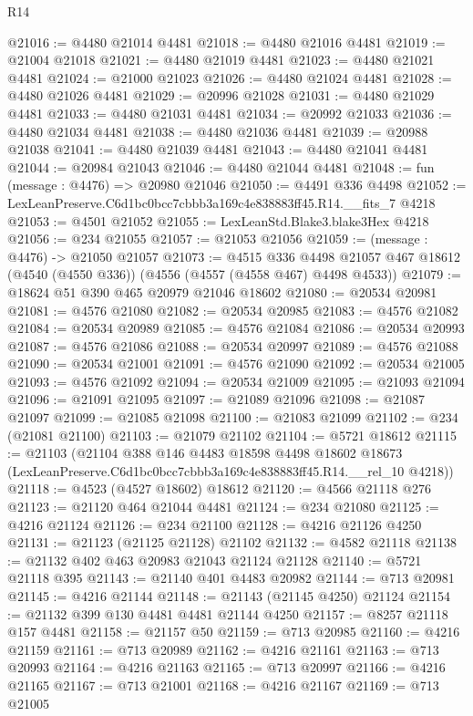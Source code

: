 \begin{lexlean}{R14}
\begin{coremodule}
@21016 := @4480 @21014 @4481
@21018 := @4480 @21016 @4481
@21019 := @21004 @21018
@21021 := @4480 @21019 @4481
@21023 := @4480 @21021 @4481
@21024 := @21000 @21023
@21026 := @4480 @21024 @4481
@21028 := @4480 @21026 @4481
@21029 := @20996 @21028
@21031 := @4480 @21029 @4481
@21033 := @4480 @21031 @4481
@21034 := @20992 @21033
@21036 := @4480 @21034 @4481
@21038 := @4480 @21036 @4481
@21039 := @20988 @21038
@21041 := @4480 @21039 @4481
@21043 := @4480 @21041 @4481
@21044 := @20984 @21043
@21046 := @4480 @21044 @4481
@21048 := fun (message : @4476) => @20980 @21046
@21050 := @4491 @336 @4498
@21052 := LexLeanPreserve.C6d1bc0bcc7cbbb3a169c4e838883ff45.R14.__fits_7 @4218
@21053 := @4501 @21052
@21055 := LexLeanStd.Blake3.blake3Hex @4218
@21056 := @234 @21055
@21057 := @21053 @21056
@21059 := (message : @4476) -> @21050 @21057
@21073 := @4515
    @336
    @4498
    @21057
    @467
    @18612
    (@4540 (@4550 @336))
    (@4556 (@4557 (@4558 @467) @4498 @4533))
@21079 := @18624 @51 @390 @465 @20979 @21046 @18602
@21080 := @20534 @20981
@21081 := @4576 @21080
@21082 := @20534 @20985
@21083 := @4576 @21082
@21084 := @20534 @20989
@21085 := @4576 @21084
@21086 := @20534 @20993
@21087 := @4576 @21086
@21088 := @20534 @20997
@21089 := @4576 @21088
@21090 := @20534 @21001
@21091 := @4576 @21090
@21092 := @20534 @21005
@21093 := @4576 @21092
@21094 := @20534 @21009
@21095 := @21093 @21094
@21096 := @21091 @21095
@21097 := @21089 @21096
@21098 := @21087 @21097
@21099 := @21085 @21098
@21100 := @21083 @21099
@21102 := @234 (@21081 @21100)
@21103 := @21079 @21102
@21104 := @5721 @18612
@21115 := @21103
    (@21104
      @388
      @146
      @4483
      @18598
      @4498
      @18602
      @18673
      (LexLeanPreserve.C6d1bc0bcc7cbbb3a169c4e838883ff45.R14.__rel_10 @4218))
@21118 := @4523 (@4527 @18602) @18612
@21120 := @4566 @21118 @276
@21123 := @21120 @464 @21044 @4481
@21124 := @234 @21080
@21125 := @4216 @21124
@21126 := @234 @21100
@21128 := @4216 @21126 @4250
@21131 := @21123 (@21125 @21128) @21102
@21132 := @4582 @21118
@21138 := @21132 @402 @463 @20983 @21043 @21124 @21128
@21140 := @5721 @21118 @395
@21143 := @21140 @401 @4483 @20982
@21144 := @713 @20981
@21145 := @4216 @21144
@21148 := @21143 (@21145 @4250) @21124
@21154 := @21132 @399 @130 @4481 @4481 @21144 @4250
@21157 := @8257 @21118 @157 @4481
@21158 := @21157 @50
@21159 := @713 @20985
@21160 := @4216 @21159
@21161 := @713 @20989
@21162 := @4216 @21161
@21163 := @713 @20993
@21164 := @4216 @21163
@21165 := @713 @20997
@21166 := @4216 @21165
@21167 := @713 @21001
@21168 := @4216 @21167
@21169 := @713 @21005

\end{coremodule}
\end{lexlean}
